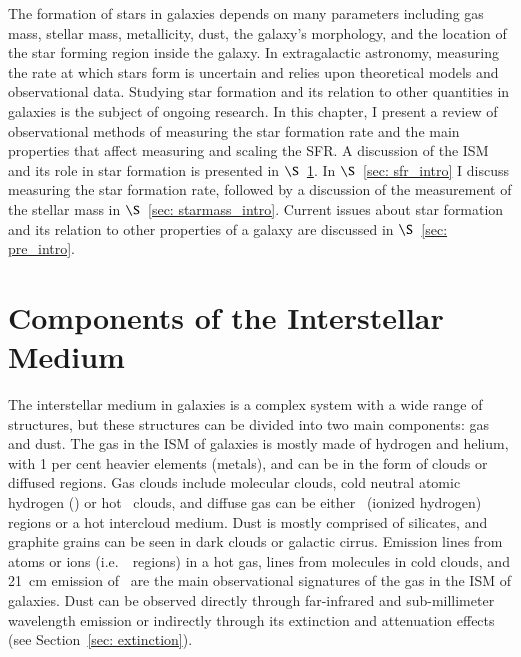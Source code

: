 The formation of stars in galaxies depends on many parameters including gas mass, stellar mass, metallicity, dust, the galaxy's morphology, and the location of the star forming region inside the galaxy.
In extragalactic astronomy, measuring the rate at which stars form is uncertain and relies upon theoretical models and observational data.
Studying star formation and its relation to other quantities in galaxies is the subject of ongoing research.
In this chapter, I present a review of observational methods of measuring the star formation rate and the main properties that affect measuring and scaling the SFR. A discussion of the ISM and its role in star formation is presented in $\S$~\ref{sec: ism_intro}. In $\S$~\ref{sec: sfr_intro} I discuss measuring the star formation rate, followed by a discussion of the measurement of the stellar mass in $\S$~\ref{sec: starmass_intro}. Current issues about star formation and its relation to other properties of a galaxy are discussed in $\S$~\ref{sec: pre_intro}. 





\section{Components of the Interstellar Medium} 
\label{sec: ism_intro}
The interstellar medium in galaxies is a complex system with a wide range of structures, but these structures can be divided into two main components: gas and dust.
The gas in the ISM of galaxies is mostly made of hydrogen and helium, with 1 per cent heavier elements (metals), and can be in the form of clouds or diffused regions.
Gas clouds include molecular clouds, cold neutral atomic hydrogen (\hi) or hot \hi~clouds, and diffuse gas can be either \hii~(ionized hydrogen) regions or a hot intercloud medium.
Dust is mostly comprised of silicates, and graphite grains can be seen in dark clouds or galactic cirrus.
Emission lines from atoms or ions (i.e.\ \hii~regions) in a hot gas, lines from molecules in cold clouds, and 21~cm emission of \hi~are the main observational signatures of the gas in the ISM of galaxies.
Dust can be observed directly through far-infrared and sub-millimeter wavelength emission or indirectly through its extinction and attenuation effects (see Section~\ref{sec: extinction}).

